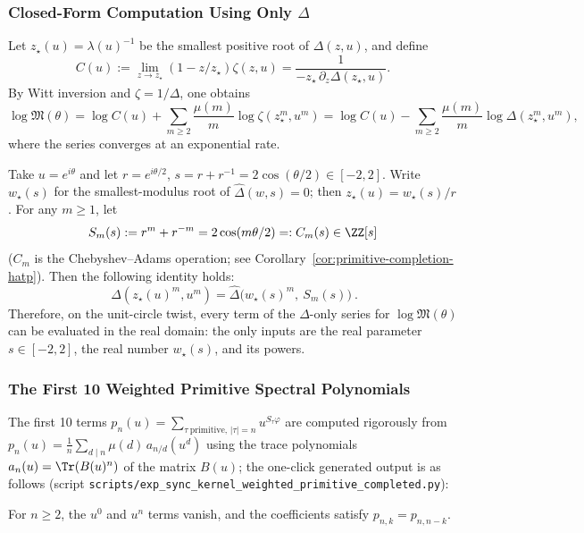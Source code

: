 \subsubsection{Closed-Form Computation Using Only \texorpdfstring{$\Delta$}{Delta}}\label{app:delta-only}
Let $z_\star(u)=\lambda(u)^{-1}$ be the smallest positive root of $\Delta(z,u)$, and define
\[
C(u):=\lim_{z\to z_\star}(1-z/z_\star)\zeta(z,u)=\frac{1}{-z_\star\,\partial_z\Delta(z_\star,u)}.
\]
By Witt inversion and $\zeta=1/\Delta$, one obtains
\[
\log\mathfrak{M}(\theta)
=\log C(u)+\sum_{m\ge 2}\frac{\mu(m)}{m}\log\zeta(z_\star^m,u^m)
=\log C(u)-\sum_{m\ge 2}\frac{\mu(m)}{m}\log\Delta(z_\star^m,u^m),
\]
where the series converges at an exponential rate.

\begin{corollary}\label{cor:sync-kernel-weighted-logM-completed-real}
Take \(u=e^{i\theta}\) and let \(r=e^{i\theta/2}\), \(s=r+r^{-1}=2\cos(\theta/2)\in[-2,2]\). Write \(w_\star(s)\) for the smallest-modulus root of \(\widehat\Delta(w,s)=0\); then \(z_\star(u)=w_\star(s)/r\).
For any \(m\ge 1\), let
\[
S_m(s):=r^m+r^{-m}=2\cos(m\theta/2)=:C_m(s)\in\ZZ[s]
\]
(\(C_m\) is the Chebyshev--Adams operation; see Corollary~\ref{cor:primitive-completion-hatp}).
Then the following identity holds:
\[
\boxed{\ \Delta(z_\star(u)^m,u^m)=\widehat\Delta\!\bigl(w_\star(s)^m,\ S_m(s)\bigr)\ }.
\]
Therefore, on the unit-circle twist, every term of the \(\Delta\)-only series for \(\log\mathfrak{M}(\theta)\) can be evaluated in the real domain: the only inputs are the real parameter \(s\in[-2,2]\), the real number \(w_\star(s)\), and its powers.
\end{corollary}

\subsubsection{The First 10 Weighted Primitive Spectral Polynomials}\label{app:weighted-primitive-table}
The first 10 terms $p_n(u)=\sum_{\tau\ \mathrm{primitive},\,|\tau|=n}u^{S_\tau\varphi}$ are computed rigorously from
\(
p_n(u)=\frac{1}{n}\sum_{d\mid n}\mu(d)\,a_{n/d}(u^d)
\)
using the trace polynomials \(a_n(u)=\Tr(B(u)^n)\) of the matrix \(B(u)\); the one-click generated output is as follows (script \texttt{scripts/exp\_sync\_kernel\_weighted\_primitive\_completed.py}):


For $n\ge 2$, the $u^0$ and $u^n$ terms vanish, and the coefficients satisfy $p_{n,k}=p_{n,n-k}$.

